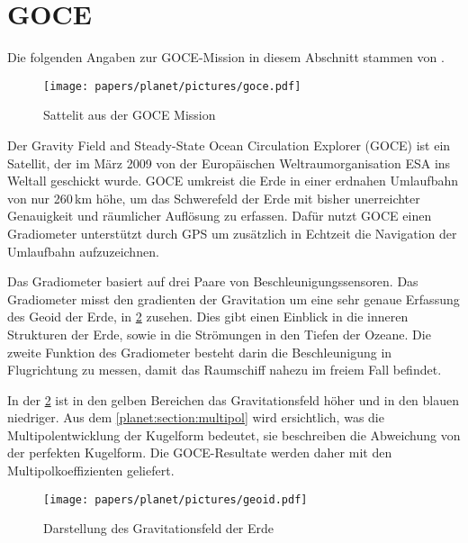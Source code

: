 %
%
%
%
\section{GOCE
\label{planet:section:goce}}

Die folgenden Angaben zur GOCE-Mission in diesem Abschnitt stammen von \cite{planet:goce}.

\begin{figure}[h]
    \centering
    \texttt{[image: papers/planet/pictures/goce.pdf]}
    \caption{Sattelit aus der GOCE Mission \cite{planet:gocepic}
        \label{planet:fig:goce}}
\end{figure}

Der Gravity Field and Steady-State Ocean Circulation Explorer (GOCE) ist ein Satellit, der im März 2009 von der Europäischen Weltraumorganisation ESA ins Weltall geschickt wurde.
GOCE umkreist die Erde in einer erdnahen Umlaufbahn von nur 260\,km höhe, um das Schwerefeld der Erde mit bisher unerreichter Genauigkeit und räumlicher Auflösung zu erfassen.
Dafür nutzt GOCE einen Gradiometer unterstützt durch GPS um zusätzlich in Echtzeit die Navigation der Umlaufbahn aufzuzeichnen.

Das Gradiometer basiert auf drei Paare von Beschleunigungssensoren.
Das Gradiometer misst den gradienten der Gravitation um eine sehr genaue Erfassung des Geoid der Erde, in \cref{planet:fig:geoid} zusehen.
Dies gibt einen Einblick in die inneren Strukturen der Erde, sowie in die Strömungen in den Tiefen der Ozeane.
Die zweite Funktion des Gradiometer besteht darin die Beschleunigung in Flugrichtung zu messen, damit das Raumschiff nahezu im freiem Fall befindet.

In der \cref{planet:fig:geoid} ist in den gelben Bereichen das Gravitationsfeld höher und in den blauen niedriger.
Aus dem \cref{planet:section:multipol} wird ersichtlich, was die Multipolentwicklung der Kugelform bedeutet, sie beschreiben die Abweichung von der perfekten Kugelform.
Die GOCE-Resultate werden daher mit den Multipolkoeffizienten geliefert.

\begin{figure}[h]
    \centering
    \texttt{[image: papers/planet/pictures/geoid.pdf]}
    \caption{Darstellung des Gravitationsfeld der Erde \cite{planet:geoidpic}
        \label{planet:fig:geoid}}
\end{figure}



